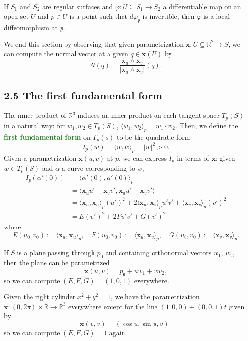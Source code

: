\documentclass[10pt]{scrartcl}
\providecommand{\RR}{\mathbb R}
\providecommand{\mb}[1]{\mathbf{#1}}
\providecommand{\vocab}[1]{{\textbf{\textcolor{ForestGreen}{#1}}}}
\begin{document}
\begin{prop}
	If $S_1$ and $S_2$ are regular surfaces and
	$\varphi\colon U\subseteq S_1\to S_2$ a differentiable map
	on an open set $U$ and $p\in U$ is a point
	such that $d\varphi_p$ is invertible,
	then $\varphi$ is a local diffeomorphism at $p$.
\end{prop}

We end this section by observing that
given parametrization $\mb x\colon U\subseteq\RR^2\to S$,
we can compute the normal vector at a given $q\in\mb x(U)$ by
\[N(q) = \frac{\mb x_u\wedge\mb x_v}{|\mb x_u\wedge\mb x_v|}(q).\]

\pagebreak
\subsection{2.5 The first fundamental form}
The inner product of $\RR^3$ induces an inner product
on each tangent space $T_p(S)$ in a natural way:
for $w_1,w_2\in T_p(S)$, $\langle w_1,w_2\rangle_p = w_1\cdot w_2$.
Then, we define the \vocab{first fundamental form} on $T_p(s)$
to be the quadratic form
\[I_p(w) = \langle w,w\rangle_p = |w|^2 > 0.\]
Given a parametrization $\mb x(u,v)$ at $p$,
we can express $I_p$ in terms of $\mb x$:
given $w\in T_p(S)$ and $\alpha$ a curve corresponding to $w$,
\begin{align*}
	I_p(\alpha'(0)) &= \langle\alpha'(0),\alpha'(0)\rangle_p\\
	&= \langle \mb x_uu'+\mb x_vv', \mb x_uu'+\mb x_vv'\rangle\\
	&= \langle\mb x_u,\mb x_u\rangle_p(u')^2
	+ 2\langle \mb x_u,\mb x_v\rangle_p u'v'
	+ \langle\mb x_v,\mb x_v\rangle_p(v')^2\\
	&= E(u')^2 + 2Fu'v' + G(v')^2
\end{align*}
where
\[E(u_0,v_0):=\langle \mb x_u,\mb x_u\rangle_p,\quad
F(u_0,v_0):=\langle \mb x_u,\mb x_v\rangle_p,\quad
G(u_0,v_0):=\langle \mb x_v,\mb x_v\rangle_p.\]

\begin{example}
	If $S$ is a plane passing through $p_0$ and containing orthonormal vectors
	$w_1$, $w_2$, then the plane can be parametrized
	\[\mb x(u,v) = p_0 + uw_1 + vw_2,\]
	so we can compute $(E,F,G) = (1,0,1)$ everywhere.
\end{example}

\begin{example}
	Given the right cylinder $x^2+y^2=1$, we have the parametrization
	$\mb x\colon(0,2\pi)\times\RR\to\RR^3$ everywhere except for the line
	$(1,0,0)+(0,0,1)t$ given by
	\[\mb x(u,v) = (\cos u,\sin u,v),\]
	so we can compute $(E,F,G) = 1$ again.
\end{example}
\end{document}
